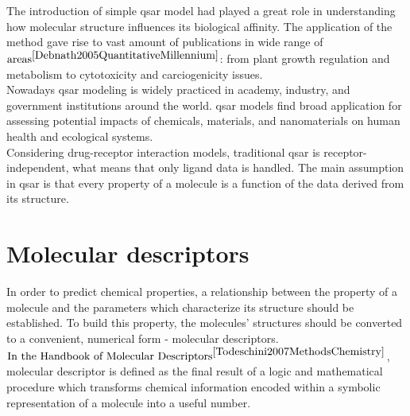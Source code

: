 The introduction of simple \acrshort{qsar} model had played a great role in understanding how molecular structure influences its biological affinity.
The application of the method gave rise to vast amount of publications in wide range of $\text{areas}^{\cite{Debnath2005QuantitativeMillennium}}$: from plant growth regulation and metabolism to cytotoxicity and carciogenicity issues.
\hfill\break\\

Nowadays \acrshort{qsar} modeling is widely practiced in academy, industry, and government institutions around the world.
\acrshort{qsar} models find broad application for assessing potential impacts of chemicals, materials, and nanomaterials on human health and ecological systems.
\hfill\break\\
Considering drug-receptor interaction models, traditional \acrshort{qsar} is receptor-independent, what means that only ligand data is handled.
The main assumption in \acrshort{qsar} is that every property of a molecule is a function of the data derived from its structure.
\hfill\break\\
\section{Molecular descriptors}
  In order to predict chemical properties, a relationship between the property of a molecule and the parameters which characterize its structure should be established.
  To build this property, the molecules' structures should be converted to a convenient, numerical form - molecular descriptors.
  $\text{In the Handbook of Molecular Descriptors}^{\cite{Todeschini2007MethodsChemistry}}$,
  molecular descriptor is defined as the final result of a logic and mathematical procedure which transforms chemical information encoded within a symbolic representation of a molecule into a useful number. \\

